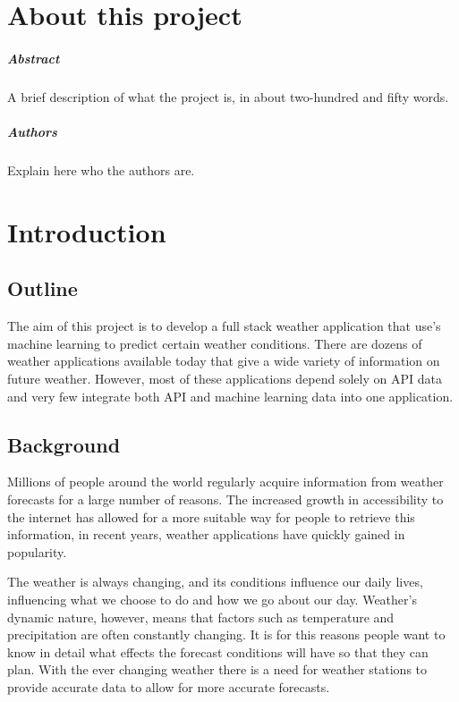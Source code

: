 
\chapter*{About this project}
\paragraph{Abstract}
A brief description of what the project is, in about two-hundred and fifty words.

\paragraph{Authors}
Explain here who the authors are.



\chapter{Introduction}

\section{Outline}
The aim of this project is to develop a full stack weather application that use's machine learning to predict certain weather conditions. There are dozens of weather applications available today that give a wide variety of information on future weather. However, most of these applications depend solely on API data and very few integrate both API and machine learning data into one application.

\section{Background}
Millions of people around the world regularly acquire information from weather forecasts for a large number of reasons. The increased growth in accessibility to the internet has allowed for a more suitable way for people to retrieve this information, in recent years, weather applications have quickly gained in popularity.

The weather is always changing, and its conditions influence our daily lives, influencing what we choose to do and how we go about our day. Weather’s dynamic nature, however, means that factors such as temperature and precipitation are often constantly changing. It is for this reasons people want to know in detail what effects the forecast conditions will have so that they can plan. \cite{WeatherontheGo} With the ever changing weather there is a need for weather stations to provide accurate data to allow for more accurate forecasts.

